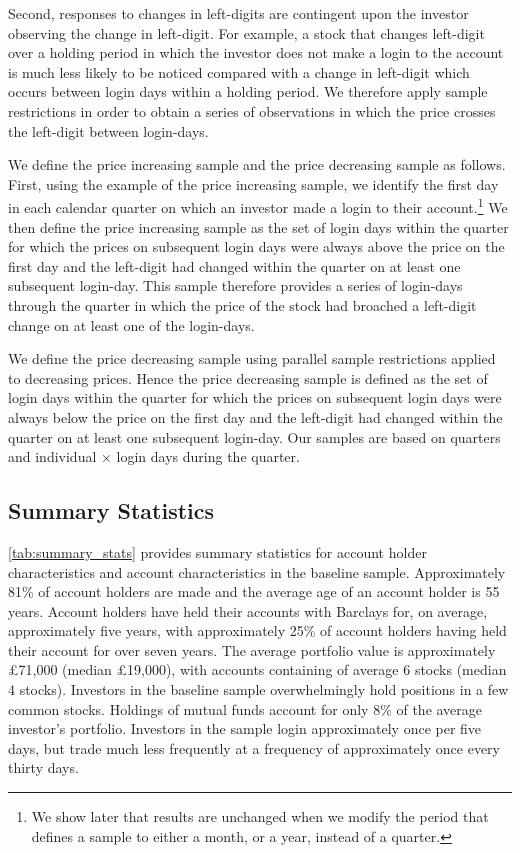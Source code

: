 Second, responses to changes in left-digits are contingent upon the investor observing the change in left-digit. For example, a stock that changes left-digit over a holding period in which the investor does not make a login to the account is much less likely to be noticed compared with a change in left-digit which occurs between login days within a holding period. We therefore apply sample restrictions in order to obtain a series of observations in which the price crosses the left-digit between login-days.

We define the price increasing sample and the price decreasing sample as follows. First, using the example of the price increasing sample, we identify the first day in each calendar quarter on which an investor made a login to their account.\footnote{We show later that results are unchanged when we modify the period that defines a sample to either a month, or a year, instead of a quarter.} We then define the price increasing sample as the set of login days within the quarter for which the prices on subsequent login days were always above the price on the first day and the left-digit had changed within the quarter on at least one subsequent login-day. This sample therefore provides a series of login-days through the quarter in which the price of the stock had broached a left-digit change on at least one of the login-days. 

We define the price decreasing sample using parallel sample restrictions applied to decreasing prices. Hence the price decreasing sample is defined as the set of login days within the quarter for which the prices on subsequent login days were always below the price on the first day and the left-digit had changed within the quarter on at least one subsequent login-day. Our samples are based on quarters and individual $\times$  login days during the quarter. 

\subsection{Summary Statistics}

\ref{tab:summary_stats} provides summary statistics for account holder characteristics and account characteristics in the baseline sample. Approximately 81\% of account holders are made and the average age of an account holder is 55 years. Account holders have held their accounts with Barclays for, on average, approximately five years, with approximately 25\% of account holders having held their account for over seven years. The average portfolio value is approximately \pounds71,000 (median \pounds19,000), with accounts containing of average 6 stocks (median 4 stocks). Investors in the baseline sample overwhelmingly hold positions in a few common stocks. Holdings of mutual funds account for only 8\% of the average investor's portfolio. Investors in the sample login approximately once per five days, but trade much less frequently at a frequency of approximately once every thirty days.

